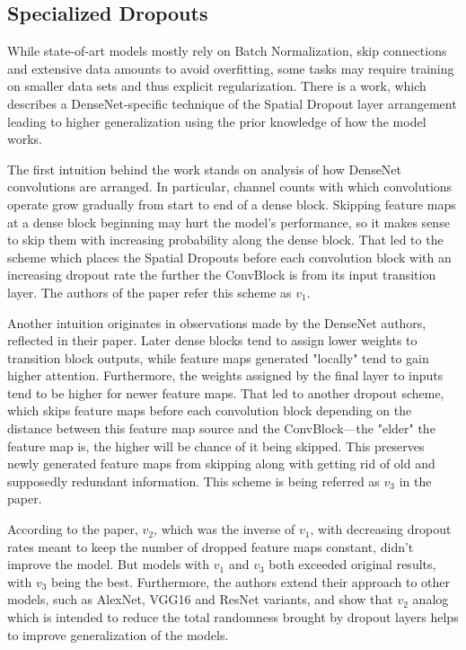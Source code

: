 \documentclass[thesis=B,english]{FITthesis}[2019/12/23]
\begin{document}
\subsection{Specialized Dropouts}

While state-of-art models mostly rely on Batch Normalization, skip connections and extensive data amounts to avoid overfitting, some tasks may require training on smaller data sets and thus explicit regularization. There is a work\cite{specialized_dropouts}, which describes a DenseNet-specific technique of the Spatial Dropout layer arrangement leading to higher generalization using the prior knowledge of how the model works.

The first intuition behind the work stands on analysis of how DenseNet convolutions are arranged. In particular, channel counts with which convolutions operate grow gradually from start to end of a dense block. Skipping feature maps at a dense block beginning may hurt the model's performance, so it makes sense to skip them with increasing probability along the dense block. That led to the scheme which places the Spatial Dropouts before each convolution block with an increasing dropout rate the further the ConvBlock is from its input transition layer. The authors of the paper refer this scheme as $v_1$.

Another intuition originates in observations made by the DenseNet authors, reflected in their paper\cite{densenet}. Later dense blocks tend to assign lower weights to transition block outputs, while feature maps generated "locally" tend to gain higher attention. Furthermore, the weights assigned by the final layer to inputs tend to be higher for newer feature maps. That led to another dropout scheme, which skips feature maps before each convolution block depending on the distance between this feature map source and the ConvBlock---the "elder" the feature map is, the higher will be chance of it being skipped. This preserves newly generated feature maps from skipping along with getting rid of old and supposedly redundant information. This scheme is being referred as $v_3$ in the paper.

According to the paper, $v_2$, which was the inverse of $v_1$, with decreasing dropout rates meant to keep the number of dropped feature maps constant, didn't improve the model. But models with $v_1$ and $v_3$ both exceeded original results, with $v_3$ being the best. Furthermore, the authors extend their approach to other models, such as AlexNet, VGG16 and ResNet variants, and show that $v_2$ analog which is intended to reduce the total randomness brought by dropout layers helps to improve generalization of the models.
\end{document}
